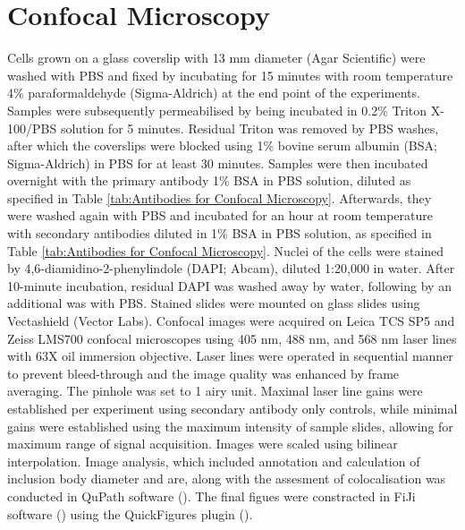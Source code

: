 \section{Confocal Microscopy} \label{sec:Confocal Microscopy}
Cells grown on a glass coverslip with 13 mm diameter (Agar Scientific) were washed with PBS and fixed by incubating for 15 minutes with room temperature 4\% paraformaldehyde (Sigma-Aldrich) at the end point of the experiments. Samples were subsequently permeabilised by being incubated in 0.2\% Triton X-100/PBS solution for 5 minutes. Residual Triton was removed by PBS washes, after which the coverslips were blocked using 1\% bovine serum albumin (BSA; Sigma-Aldrich) in PBS for at least 30 minutes. Samples were then incubated overnight with the primary antibody 1\% BSA in PBS solution, diluted as specified in Table \ref{tab:Antibodies for Confocal Microscopy}. Afterwards, they were washed again with PBS and incubated for an hour at room temperature with secondary antibodies diluted in 1\% BSA in PBS solution, as specified in Table \ref{tab:Antibodies for Confocal Microscopy}. Nuclei of the cells were stained by 4,6-diamidino-2-phenylindole (DAPI; Abcam), diluted 1:20,000 in water. After 10-minute incubation, residual DAPI was washed away by water, following by an additional was with PBS. Stained slides were mounted on glass slides using Vectashield (Vector Labs). Confocal images were acquired on Leica TCS SP5 and Zeiss LMS700 confocal microscopes using 405 nm, 488 nm, and 568 nm laser lines with 63X oil immersion objective. Laser lines were operated in sequential manner to prevent bleed-through and the image quality was enhanced by frame averaging. The pinhole was set to 1 airy unit. Maximal laser line gains were established per experiment using secondary antibody only controls, while minimal gains were established using the maximum intensity of sample slides, allowing for maximum range of signal acquisition. Images were scaled using bilinear interpolation. Image analysis, which included annotation and calculation of inclusion body diameter and are, along with the assesment of colocalisation was conducted in QuPath software (\cite{Bankhead2017QuPath:Analysis}). The final figues were constracted in FiJi software (\cite{Schindelin2012Fiji:Analysis}) using the QuickFigures plugin (\cite{Mazo2021QuickFigures:Figures}).

